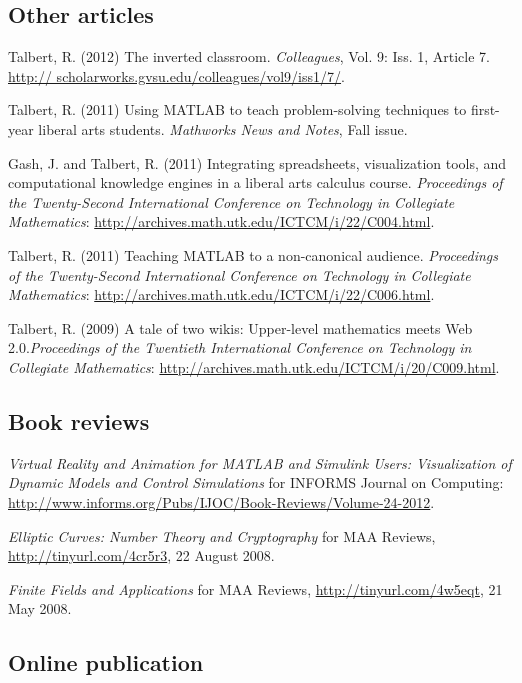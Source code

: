 \documentclass[letterpaper]{article}
\renewenvironment{itemize}{
  \begin{list}{}{
    \setlength{\leftmargin}{1.5em}
	\setlength{\itemsep}{0in}
  }
}{
  \end{list}
}
\begin{document}
\subsection*{Other articles}
\begin{itemize}
	\item Talbert, R. (2012) The inverted classroom. \emph{Colleagues}, Vol. 9: Iss. 1, Article 7. \url{http:// scholarworks.gvsu.edu/colleagues/vol9/iss1/7/}.  
	\item Talbert, R. (2011) Using MATLAB to teach problem-solving techniques to first-year liberal arts students.\emph{ Mathworks News and Notes}, Fall issue.
	\item Gash, J. and Talbert, R. (2011) Integrating spreadsheets, visualization tools, and computational knowledge engines in a liberal arts calculus course. \emph{Proceedings of the Twenty-Second International Conference on Technology in Collegiate Mathematics}: \url{http://archives.math.utk.edu/ICTCM/i/22/C004.html}. 
	\item Talbert, R. (2011) Teaching MATLAB to a non-canonical audience. \emph{Proceedings of the Twenty-Second International Conference on Technology in Collegiate Mathematics}: \url{http://archives.math.utk.edu/ICTCM/i/22/C006.html}. 
	\item Talbert, R. (2009) A tale of two wikis: Upper-level mathematics meets Web 2.0.\emph{Proceedings of the Twentieth International Conference on Technology in Collegiate Mathematics}: \url{http://archives.math.utk.edu/ICTCM/i/20/C009.html}.
\end{itemize}

\subsection*{Book reviews}
\begin{itemize}
	\item \emph{Virtual Reality and Animation for MATLAB and Simulink Users: Visualization of Dynamic Models and Control Simulations} for INFORMS Journal on Computing: \url{http://www.informs.org/Pubs/IJOC/Book-Reviews/Volume-24-2012}. 
	\item \emph{Elliptic Curves: Number Theory and Cryptography} for MAA Reviews, \url{http://tinyurl.com/4cr5r3}, 22 August 2008.
	\item \emph{Finite Fields and Applications} for MAA Reviews, \url{http://tinyurl.com/4w5eqt}, 21 May 2008.
\end{itemize}

\subsection*{Online publication}
\end{document}
